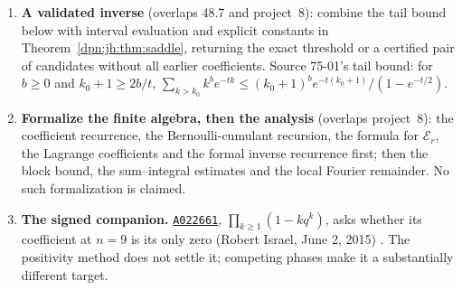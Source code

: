 \documentclass[11pt]{article}
\numberwithin{equation}{section}
\theoremstyle{definition}\newtheorem{definition}[theorem]{Definition}
\theoremstyle{remark}\newtheorem{remark}[theorem]{Remark}
\newcommand{\OEIS}[1]{\href{https://oeis.org/#1}{\texttt{#1}}}
\begin{document}
\begin{enumerate}[label=\textbf{75-01.\arabic*}, leftmargin=*]
  48.3 and 48.4): number of parts and largest part, with the correct
  conditional fluctuation scales.
\item \textbf{A validated inverse} (overlaps 48.7 and project~8): combine the
  tail bound below with interval evaluation and explicit constants in
  Theorem~\ref{dpn:jh:thm:saddle}, returning the exact threshold or a
  certified pair of candidates without all earlier coefficients.  Source
  75-01's tail bound: for $b\ge0$ and $k_0+1\ge2b/t$,
  $\sum_{k>k_0}k^be^{-tk}\le(k_0+1)^be^{-t(k_0+1)}/(1-e^{-t/2})$.
\item \textbf{Formalize the finite algebra, then the analysis} (overlaps
  project~8): the coefficient recurrence, the Bernoulli-cumulant recursion,
  the formula for $\mathcal E_r$, the Lagrange coefficients and the formal
  inverse recurrence first; then the block bound, the sum--integral estimates
  and the local Fourier remainder.  No such formalization is claimed.
\item \textbf{The signed companion.}  \OEIS{A022661}, $\prod_{k\ge1}(1-kq^k)$,
  asks whether its coefficient at $n=9$ is its only zero (Robert Israel,
  June 2, 2015) \cite{oeissigned}.  The positivity method does not settle it;
  competing phases make it a substantially different target.
\end{enumerate}
\end{document}
